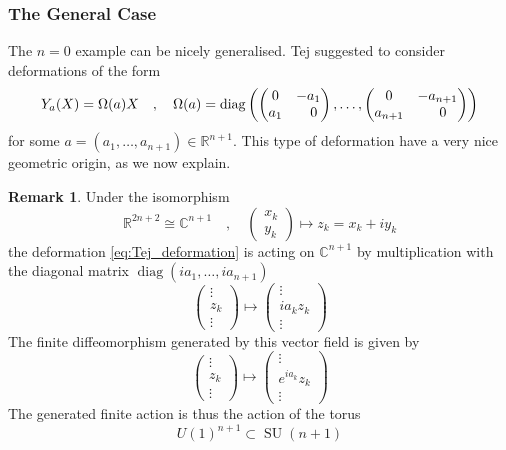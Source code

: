 \documentclass[a4paper,11pt]{article}
\theoremstyle{definition}
\newtheorem{remark}{Remark}
\newcommand{\RR}{\mathbb{R}}
\newcommand{\CC}{\mathbb{C}}
\DeclareMathOperator{\SU}{SU}
\DeclareMathOperator{\diag}{diag}
\newcommand{\mat}[4]{\begin{pmatrix} #1 & #2 \\ #3 & #4 \end{pmatrix}}
\newcommand{\vek}[2]{\begin{pmatrix} #1 \\ #2 \end{pmatrix}}
\begin{document}
\subsubsection{The General Case}
The $n=0$ example can be nicely generalised. 
Tej suggested to consider deformations of the form
\begin{equation}
  Y_a(X) = \Omega(a) X \quad , \quad \Omega(a) = \diag\left( \mat{0}{-a_1}{a_1}{\hphantom{-}0}, \dots, \mat{0}{-a_{n+1}}{a_{n+1}}{\hphantom{-}0} \right)
  \label{eq:Tej_deformation}
\end{equation}
for some $a = (a_1, \dots, a_{n+1}) \in \RR^{n+1}$.
This type of deformation have a very nice geometric origin, as we now explain.
\begin{remark}
  Under the isomorphism 
  \begin{equation}
    \RR^{2n + 2} \cong \CC^{n+1} \quad , \quad \vek{x_k}{y_k} \mapsto z_k = x_k + i y_k
  \end{equation}
  the deformation \eqref{eq:Tej_deformation} is acting on $\CC^{n+1}$ by multiplication with the diagonal matrix $\diag(i a_1, \dots, i a_{n+1})$
    \begin{equation}
      \begin{pmatrix} \vdots \\ z_k \\ \vdots \end{pmatrix} \mapsto \begin{pmatrix} \vdots \\ i a_k z_k \\  \vdots \end{pmatrix} 
    \end{equation}
    The finite diffeomorphism generated by this vector field is given by 
    \begin{equation}
      \begin{pmatrix} \vdots \\ z_k \\ \vdots \end{pmatrix} \mapsto \begin{pmatrix} \vdots \\ e^{i a_k} z_k \\  \vdots \end{pmatrix} 
    \end{equation}
    The generated finite action is thus the action of the torus 
    \begin{equation}
      U(1)^{n+1} \subset \SU(n+1)
    \end{equation}
\end{remark}
\end{document}
